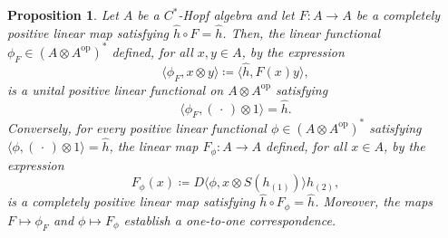 \documentclass[a4paper,10pt]{amsart}
\newcommand{\eval}[2]{\langle #1 , #2\rangle}
\newcommand{\placeholder}{\,\cdot\,}
\newtheorem{proposition}[theorem]{Proposition}
\theoremstyle{definition}
\begin{document}
\begin{proposition}\label{prop:Fphi}
    Let $A$ be a $C^*$-Hopf algebra and let $F : A \to A$ be a completely positive linear map satisfying $\hat{h} \circ F = \hat{h}$. Then, the linear functional $\phi_F \in (A \otimes A^{\mathrm{op}})^*$ defined, for all $x, y \in A$, by the expression
	\begin{equation}\label{eq:FtophiF}
		\eval{\phi_F}{x\otimes y} \coloneqq \eval{\hat{h}}{F(x) y},
	\end{equation}
	is a unital positive linear functional on $A\otimes A^{\mathrm{op}}$ satisfying
	\begin{equation}\label{eq:TPphiF}
		\eval{\phi_F}{(\placeholder)\otimes 1} = \hat{h}.
	\end{equation}
	Conversely, for every positive linear functional $\phi\in (A\otimes A^{\mathrm{op}})^*$ satisfying
$\eval{\phi}{(\placeholder)\otimes 1}=\hat{h}$, the linear map $F_\phi:A\to A$ defined, for all $x\in A$, by the expression
	\begin{equation}\label{eq:phitoFphi}
		F_\phi(x) \coloneqq D \eval{\phi}{x\otimes S(h_{(1)})} h_{(2)},
	\end{equation}
	is a completely positive linear map satisfying $\hat{h}\circ F_\phi = \hat{h}$. Moreover, the maps $F\mapsto \phi_F$ and $\phi\mapsto F_\phi$ establish a one-to-one correspondence.
\end{proposition}
\end{document}

